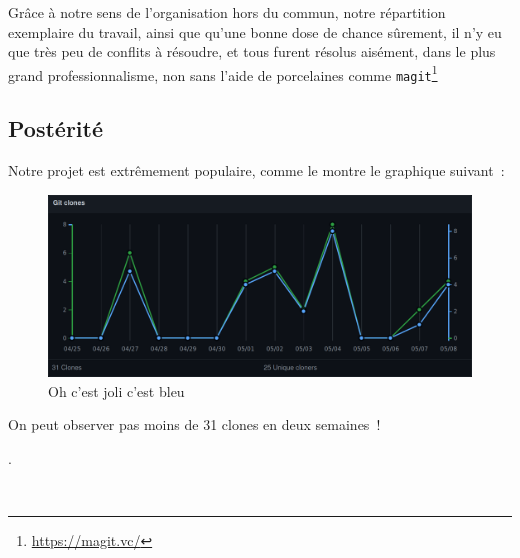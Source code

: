 \documentclass[a4, 12pt, titlepage]{scrartcl}
\begin{document}
Grâce à notre sens de l'organisation hors du commun, notre répartition
exemplaire du travail, ainsi que qu'une bonne dose de chance sûrement,
il n'y eu que très peu de conflits à résoudre, et tous furent résolus
aisément, dans le plus grand professionnalisme, non sans l'aide de
porcelaines comme \texttt{magit}\footnote{\url{https://magit.vc/}}

\subsection{Postérité}\label{subsec:32}

Notre projet est extrêmement populaire, comme le montre le graphique
suivant~:

\begin{figure}[H]
  \centering
  \includegraphics[width=\linewidth]{figures/clones.png}
  \caption{\label{fig:clones} Oh c'est joli c'est bleu}
\end{figure}

On peut observer pas moins de 31 clones en deux semaines~!

\cite{Landin66}.



~\cite{Tchana21}




\end{document}
